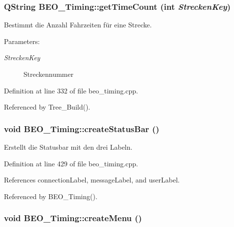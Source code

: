 \hypertarget{class_b_e_o___timing_4ca53b436da6fdf16737147cfaf69f87}{
\subsubsection[getTimeCount]{\setlength{\rightskip}{0pt plus 5cm}QString BEO\_\-Timing::getTimeCount (int {\em StreckenKey})}}
\label{class_b_e_o___timing_4ca53b436da6fdf16737147cfaf69f87}


Bestimmt die Anzahl Fahrzeiten für eine Strecke. 

\begin{Desc}
\item[Parameters:]
\begin{description}
\item[{\em StreckenKey}]Streckennummer \end{description}
\end{Desc}


Definition at line 332 of file beo\_\-timing.cpp.

Referenced by Tree\_\-Build().\hypertarget{class_b_e_o___timing_8f8ee452bed83bd1eb01ba25f3074232}{
\subsubsection[createStatusBar]{\setlength{\rightskip}{0pt plus 5cm}void BEO\_\-Timing::createStatusBar ()}}
\label{class_b_e_o___timing_8f8ee452bed83bd1eb01ba25f3074232}


Erstellt die Statusbar mit den drei Labeln. 



Definition at line 429 of file beo\_\-timing.cpp.

References connectionLabel, messageLabel, and userLabel.

Referenced by BEO\_\-Timing().\hypertarget{class_b_e_o___timing_63c37dc34b4caddfea648850ce260c28}{
\subsubsection[createMenu]{\setlength{\rightskip}{0pt plus 5cm}void BEO\_\-Timing::createMenu ()}}
\label{class_b_e_o___timing_63c37dc34b4caddfea648850ce260c28}


